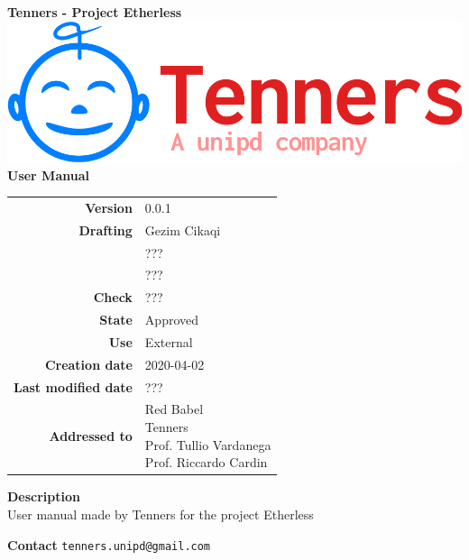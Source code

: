 \begin{titlepage}
	\begin{center}
		\large \textbf{Tenners - Project Etherless}
		\vfill
		\includegraphics[scale = 0.3]{./res/img/logo.png}\\
		\vfill
		\Huge \textbf{User Manual}

        \vfill
        \large

        \begin{tabular}{r|l}
                        \textbf{Version} & 0.0.1 \\
                        \textbf{Drafting} &
                        Gezim Cikaqi\\&
                        ???\\&
						???\\
                        \textbf{Check} &
                        ???\\
                        \textbf{State} & Approved \\
                        \textbf{Use} & External\\
                        \textbf{Creation date} &  2020-04-02\\
                        \textbf{Last modified date} &  ???\\
                        \textbf{Addressed to} & \parbox[t]{5cm}{Red Babel \\Tenners \\Prof. Tullio Vardanega \\Prof. Riccardo Cardin
                        							}
                \end{tabular}
                \vfill
                \normalsize
                \vfill
                                \textbf{Description}
                \\User manual made by Tenners for the project Etherless
                \vfill
                \normalsize
                \vfill
                
                \textbf{Contact}
                \texttt{tenners.unipd@gmail.com}

	\end{center}
\end{titlepage}
